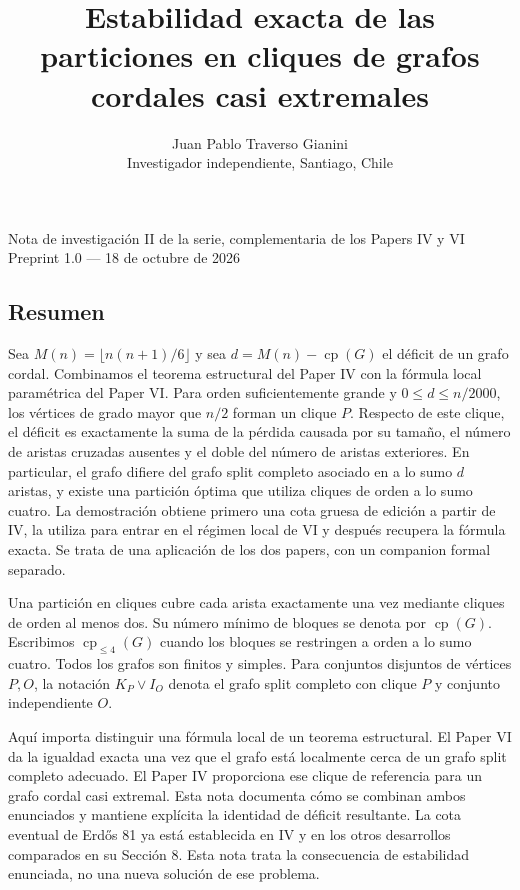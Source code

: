 \documentclass[spanish,11pt,a4paper]{article}
\title{Estabilidad exacta de las particiones en cliques de grafos cordales casi
extremales}
\author{Juan Pablo Traverso Gianini\\
Investigador independiente, Santiago, Chile}
\date{}
\begin{document}
\raggedbottom\maketitle
Nota de investigación II de la serie, complementaria de los Papers IV y
VI\\
Preprint 1.0 --- 18 de octubre de 2026

\subsection{Resumen}\label{resumen}

Sea \(M(n)=\lfloor n(n+1)/6\rfloor\) y sea
\(d=M(n)-\operatorname{cp}(G)\) el déficit de un grafo cordal.
Combinamos el teorema estructural del Paper IV con la fórmula local
paramétrica del Paper VI. Para orden suficientemente grande y
\(0\le d\le n/2000\), los vértices de grado mayor que \(n/2\) forman un
clique \(P\). Respecto de este clique, el déficit es exactamente la suma
de la pérdida causada por su tamaño, el número de aristas cruzadas
ausentes y el doble del número de aristas exteriores. En particular, el
grafo difiere del grafo split completo asociado en a lo sumo \(d\)
aristas, y existe una partición óptima que utiliza cliques de orden a lo
sumo cuatro. La demostración obtiene primero una cota gruesa de edición
a partir de IV, la utiliza para entrar en el régimen local de VI y
después recupera la fórmula exacta. Se trata de una aplicación de los
dos papers, con un companion formal separado.

Una partición en cliques cubre cada arista exactamente una vez mediante
cliques de orden al menos dos. Su número mínimo de bloques se denota por
\(\operatorname{cp}(G)\). Escribimos \(\operatorname{cp}_{\le4}(G)\)
cuando los bloques se restringen a orden a lo sumo cuatro. Todos los
grafos son finitos y simples. Para conjuntos disjuntos de vértices
\(P,O\), la notación \(K_P\vee I_O\) denota el grafo split completo con
clique \(P\) y conjunto independiente \(O\).

Aquí importa distinguir una fórmula local de un teorema estructural. El
Paper VI da la igualdad exacta una vez que el grafo está localmente
cerca de un grafo split completo adecuado. El Paper IV proporciona ese
clique de referencia para un grafo cordal casi extremal. Esta nota
documenta cómo se combinan ambos enunciados y mantiene explícita la
identidad de déficit resultante. La cota eventual de Erdős 81 ya está
establecida en IV y en los otros desarrollos comparados en su Sección 8.
Esta nota trata la consecuencia de estabilidad enunciada, no una nueva
solución de ese problema.
\end{document}
